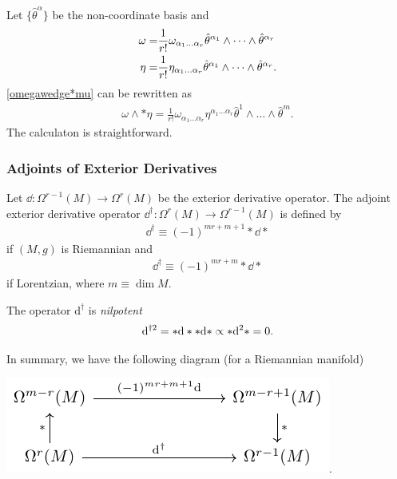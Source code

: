 \documentclass[10pt]{article}
\begin{document}
\begin{remark}
    Let $\{\hat{\theta}^\alpha\}$ be the non-coordinate basis and
    \begin{align}
        \omega= & \frac{1}{r!}\omega_{\alpha_1\dots\alpha_r}\hat{\theta}^{\alpha_1}\wedge\dots\wedge\hat{\theta}^{\alpha_r}\notag \\
        \eta=   & \frac{1}{r!}\eta_{\alpha_1\dots\alpha_r}\hat{\theta}^{\alpha_1}\wedge\dots\wedge\hat{\theta}^{\alpha_r}.\notag
    \end{align}
    \eqref{omegawedge*mu} can be rewritten as
    \begin{align}
        \omega\wedge\ast\eta=\frac{1}{r!}\omega_{\alpha_1\dots\alpha_r}\eta^{\alpha_1\dots\alpha_r}\hat{\theta}^1\wedge\dots\wedge\hat{\theta}^m.
    \end{align}
    The calculaton is straightforward.
\end{remark}

\subsubsection{Adjoints of Exterior Derivatives}
\begin{definition}
    Let $\dd:\Omega^{r-1}(M)\to\Omega^r(M)$ be the exterior derivative operator.
    The adjoint exterior derivative operator $\dd^{\dagger}:\Omega^r(M)\to\Omega^{r-1}(M)$ is defined by
    \begin{align}
        \dd^\dagger \equiv(-1)^{mr+m+1}\ast\dd\ast
    \end{align}
    if $(M,g)$ is Riemannian and
    \begin{align}
        \dd^\dagger\equiv(-1)^{mr+m}\ast\dd\ast
    \end{align}
    if Lorentzian, where $m\equiv\dim M$.
\end{definition}
\begin{property}
    The operator $\mathrm{d}^{\dagger}$ is \textit{nilpotent}
    \begin{align}
        \mathrm{d}^{\dagger 2}=\ast\mathrm{d}\ast\ast\mathrm{d}\ast\propto\ast\mathrm{d}^2\ast=0.
    \end{align}
\end{property}

In summary, we have the following diagram (for a Riemannian manifold)
\begin{center}
    \includegraphics{figures/riemannian geometry/commutative/fig.pdf}.
\end{center}
\end{document}
